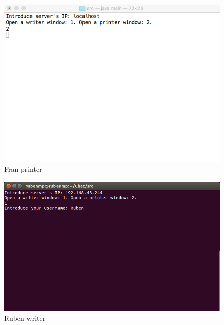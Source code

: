 \vspace{0.1cm}

\begin{figure}[H]
	\includegraphics[scale=0.55]{./Imagenes/franprinter1.png}
	\caption{Fran printer}
\end{figure}

\vspace{0.1cm}

\begin{figure}[H]
	\includegraphics[scale=0.55]{./Imagenes/rubenwriter1.png}
	\caption{Ruben writer}
\end{figure}

\vspace{0.1cm}

